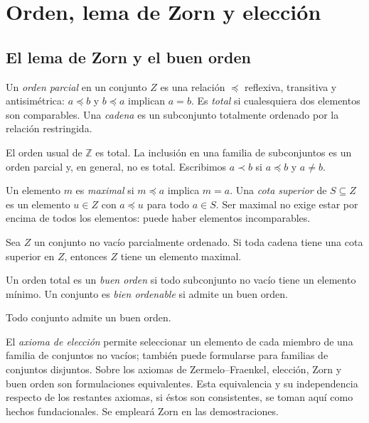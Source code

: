 \section{Orden, lema de Zorn y elección}\label{sec:preliminares-orden}

\subsection{El lema de Zorn y el buen orden}\label{tema:17-2-1}
\begin{defi}
Un \emph{orden parcial} en un conjunto $Z$ es una relación $\preceq$ reflexiva, transitiva y antisimétrica: $a\preceq b$ y $b\preceq a$ implican $a=b$. Es \emph{total} si cualesquiera dos elementos son comparables. Una \emph{cadena} es un subconjunto totalmente ordenado por la relación restringida.
\end{defi}
El orden usual de $\mathbb Z$ es total. La inclusión en una familia de subconjuntos es un orden parcial y, en general, no es total. Escribimos $a\prec b$ si $a\preceq b$ y $a\ne b$.

Un elemento $m$ es \emph{maximal} si $m\preceq a$ implica $m=a$. Una \emph{cota superior} de $S\subseteq Z$ es un elemento $u\in Z$ con $a\preceq u$ para todo $a\in S$. Ser maximal no exige estar por encima de todos los elementos: puede haber elementos incomparables.

\begin{lema}[Zorn]\label{lema:C17-Zorn}
Sea $Z$ un conjunto no vacío parcialmente ordenado. Si toda cadena tiene una cota superior en $Z$, entonces $Z$ tiene un elemento maximal.
\end{lema}
\begin{defi}
Un orden total es un \emph{buen orden} si todo subconjunto no vacío tiene un elemento mínimo. Un conjunto es \emph{bien ordenable} si admite un buen orden.
\end{defi}
\begin{teo}
Todo conjunto admite un buen orden.
\end{teo}
El \emph{axioma de elección} permite seleccionar un elemento de cada miembro de una familia de conjuntos no vacíos; también puede formularse para familias de conjuntos disjuntos. Sobre los axiomas de Zermelo--Fraenkel, elección, Zorn y buen orden son formulaciones equivalentes. Esta equivalencia y su independencia respecto de los restantes axiomas, si éstos son consistentes, se toman aquí como hechos fundacionales. Se empleará Zorn en las demostraciones.
